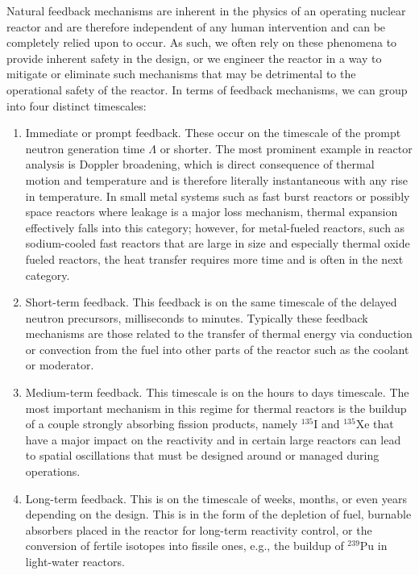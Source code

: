Natural feedback mechanisms are inherent in the physics of an operating nuclear reactor and are therefore independent of any human intervention and can be completely relied upon to occur. As such, we often rely on these phenomena to provide inherent safety in the design, or we engineer the reactor in a way to mitigate or eliminate such mechanisms that may be detrimental to the operational safety of the reactor. In terms of feedback mechanisms, we can group into four distinct timescales:
\begin{enumerate}
  \item Immediate or prompt feedback. These occur on the timescale of the prompt neutron generation time $\Lambda$ or shorter. The most prominent example in reactor analysis is Doppler broadening, which is direct consequence of thermal motion and temperature and is therefore literally instantaneous with any rise in temperature. In small metal systems such as fast burst reactors or possibly space reactors where leakage is a major loss mechanism, thermal expansion effectively falls into this category; however, for metal-fueled reactors, such as sodium-cooled fast reactors that are large in size and especially thermal oxide fueled reactors, the heat transfer requires more time and is often in the next category.
  \item Short-term feedback. This feedback is on the same timescale of the delayed neutron precursors, milliseconds to minutes. Typically these feedback mechanisms are those related to the transfer of thermal energy via conduction or convection from the fuel into other parts of the reactor such as the coolant or moderator.
  \item Medium-term feedback. This timescale is on the hours to days timescale. The most important mechanism in this regime for thermal reactors is the buildup of a couple strongly absorbing fission products, namely $^{135}$I and $^{135}$Xe that have a major impact on the reactivity and in certain large reactors can lead to spatial oscillations that must be designed around or managed during operations.
  \item Long-term feedback. This is on the timescale of weeks, months, or even years depending on the design. This is in the form of the depletion of fuel, burnable absorbers placed in the reactor for long-term reactivity control, or the conversion of fertile isotopes into fissile ones, e.g., the buildup of $^{239}$Pu in light-water reactors.
\end{enumerate}

